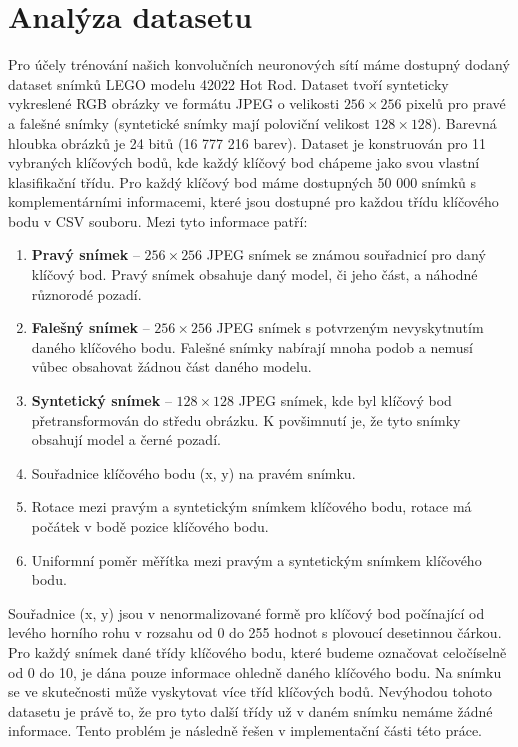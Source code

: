 \section{Analýza datasetu}
\label{sec:Chapter31}
Pro účely trénování našich konvolučních neuronových sítí máme dostupný dodaný dataset snímků LEGO modelu 42022 Hot Rod. Dataset tvoří synteticky vykreslené RGB obrázky ve formátu JPEG o velikosti $256\times256$ pixelů pro pravé a falešné snímky (syntetické snímky mají poloviční velikost $128\times128$). Barevná hloubka obrázků je 24 bitů (16 777 216 barev). Dataset je konstruován pro 11 vybraných klíčových bodů, kde každý klíčový bod chápeme jako svou vlastní klasifikační třídu. Pro každý klíčový bod máme dostupných 50 000 snímků s komplementárními informacemi, které jsou dostupné pro každou třídu klíčového bodu v CSV souboru. Mezi tyto informace patří:
\begin{enumerate}
  \item \textbf{Pravý snímek} -- $256\times256$ JPEG snímek se známou souřadnicí pro daný klíčový bod. Pravý snímek obsahuje daný model, či jeho část, a náhodné různorodé pozadí.
  \item \textbf{Falešný snímek} -- $256\times256$ JPEG snímek s potvrzeným nevyskytnutím daného klíčového bodu. Falešné snímky nabírají mnoha podob a nemusí vůbec obsahovat žádnou část daného modelu.
  \item \textbf{Syntetický snímek} -- $128\times128$ JPEG snímek, kde byl klíčový bod přetransformován do středu obrázku. K povšimnutí je, že tyto snímky obsahují model a černé pozadí.
  \item Souřadnice klíčového bodu (x, y) na pravém snímku.
  \item Rotace mezi pravým a syntetickým snímkem klíčového bodu, rotace má počátek v bodě pozice klíčového bodu.
  \item Uniformní poměr měřítka mezi pravým a syntetickým snímkem klíčového bodu.
\end{enumerate}

Souřadnice (x, y) jsou v nenormalizované formě pro klíčový bod počínající od levého horního rohu v rozsahu od 0 do 255 hodnot s plovoucí desetinnou čárkou. Pro každý snímek dané třídy klíčového bodu, které budeme označovat celočíselně od 0 do 10, je dána pouze informace ohledně daného klíčového bodu. Na snímku se ve skutečnosti může vyskytovat více tříd klíčových bodů. Nevýhodou tohoto datasetu je právě to, že pro tyto další třídy už v daném snímku nemáme žádné informace. Tento problém je následně řešen v implementační části této práce.



